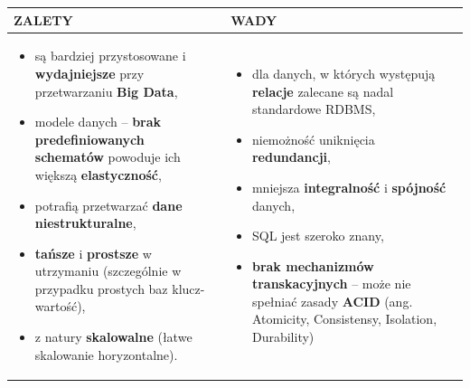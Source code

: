 \documentclass[a4paper]{article}
\begin{document}
    \begin{table}[H]
        \begin{center}
            \begin{tabular}{p{8cm} | p{8cm}}
                \textbf{ZALETY} & \textbf{WADY} \\
                \hline
                \begin{itemize}[noitemsep]
                    \item są bardziej przystosowane i \textbf{wydajniejsze} przy przetwarzaniu \textbf{Big Data},
                    \item modele danych – \textbf{brak predefiniowanych schematów} powoduje ich większą
                    \textbf{elastyczność},
                    \item potrafią przetwarzać \textbf{dane niestrukturalne},
                    \item \textbf{tańsze} i \textbf{prostsze} w utrzymaniu (szczególnie w przypadku prostych baz
                    klucz-wartość),
                    \item z natury \textbf{skalowalne} (łatwe skalowanie horyzontalne).
                \end{itemize}
                &
                \begin{itemize}[noitemsep]
                    \item dla danych, w których występują \textbf{relacje} zalecane są nadal standardowe RDBMS,
                    \item niemożność uniknięcia \textbf{redundancji},
                    \item mniejsza \textbf{integralność} i \textbf{spójność} danych,
                    \item SQL jest szeroko znany,
                    \item \textbf{brak mechanizmów transkacyjnych} – może nie spełniać zasady \textbf{ACID}
                    (ang. Atomicity, Consistensy, Isolation, Durability)
                \end{itemize} \\
            \end{tabular}
        \end{center}
    \end{table}
\end{document}

